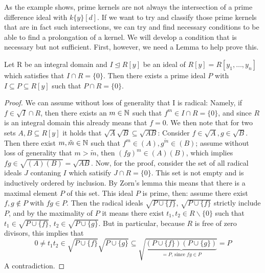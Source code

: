As the example shows, prime kernels are not always the intersection of a prime difference ideal with $k\{y\}[d]$. 
If we want to try and classify those prime kernels that are in fact such intersections, we can try and find necessary conditions to be able to find a prolongation of a kernel. 
We will develop a condition that is necessary but not sufficient. First, however, we need a Lemma to help prove this.

\begin{lem}\label{primeoverp1}
Let R be an integral domain and $I \unlhd R[y]$ be an ideal of $R[y] = R[y_1,\ldots,y_n]$ which satisfies that $I \cap R = \{ 0 \}$.
Then there exists a prime ideal $P$ with $I \subseteq P \subseteq R[y] $ such that $P \cap R = \{0\}$.
\begin{proof}
We can assume without loss of generality that I is radical:
Namely, if $f \in \sqrt{I} \cap R$, then there exists an $m \in \mathbb{N}$ such that $f^m \in I \cap R = \{0\}$, and since $R$ is an integral domain this already means that $f = 0$.
We then note that for two sets $A,B \subseteq R[y]$ it holds that $\sqrt{A}\sqrt{B} \subseteq \sqrt{AB}$: Consider $f \in \sqrt{A}, g \in \sqrt{B}$. Then there exist $m, \tilde m \in \mathbb{N}$ such that $f^m \in (A), g^{\tilde m} \in (B)$;
 assume without loss of generality that $m > \tilde m$, then $(fg)^m \in (A)(B)$, which implies $fg \in \sqrt{(A)(B)} = \sqrt{AB}$.
Now, for the proof, consider the set of all radical ideals $J$ contaning $I$ which satisify $J \cap R = \{0\}$. This set is not empty and is inductively ordered by inclusion.
By Zorn's lemma this means that there is a maximal element $P$ of this set. This ideal $P$ is prime, then: assume there exist $f,g \notin P$ with $fg \in P$. 
Then the radical ideals $\sqrt{P \cup \{f\}}$, $\sqrt{P \cup \{f\}}$ strictly include $P$, and by the maximality of $P$ it means there exist $t_1, t_2 \in R\backslash\{0\}$ such that
$t_1 \in \sqrt{P \cup \{f\}}$, $t_2 \in \sqrt{P \cup \{g\}}$. But in particular, because $R$ is free of zero divisors, this implies that
 \[0 \neq t_1t_2 \in \sqrt{P \cup \{f\}}\sqrt{P \cup \{g\}} \subseteq \sqrt{ \underbrace{(P \cup \{f\})(P \cup \{g\})}_{=P\text{, since }fg \in P}} = P\]
A contradiction.
\end{proof}
\end{lem}


